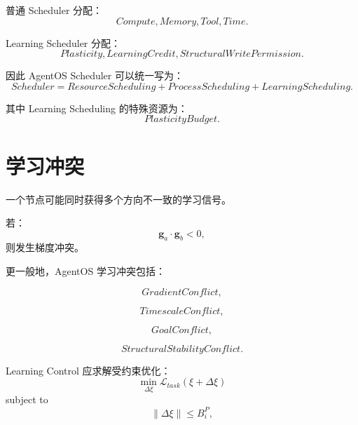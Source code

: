 普通 Scheduler 分配：
\begin{equation}
Compute,
Memory,
Tool,
Time.
\end{equation}

Learning Scheduler 分配：
\begin{equation}
Plasticity,
LearningCredit,
StructuralWritePermission.
\end{equation}

因此 AgentOS Scheduler 可以统一写为：
\begin{equation}
\boxed{
Scheduler
=
ResourceScheduling
+
ProcessScheduling
+
LearningScheduling.
}
\end{equation}

其中 Learning Scheduling 的特殊资源为：
\begin{equation}
\boxed{
PlasticityBudget.
}
\end{equation}


\section{学习冲突}

一个节点可能同时获得多个方向不一致的学习信号。

若：
\begin{equation}
\mathbf{g}_a
\cdot
\mathbf{g}_b
<
0,
\end{equation}
则发生梯度冲突。

更一般地，AgentOS 学习冲突包括：

\begin{equation}
GradientConflict,
\end{equation}

\begin{equation}
TimescaleConflict,
\end{equation}

\begin{equation}
GoalConflict,
\end{equation}

\begin{equation}
StructuralStabilityConflict.
\end{equation}

Learning Control 应求解受约束优化：
\begin{equation}
\min_{\Delta\xi}
\mathcal{L}_{task}(\xi+\Delta\xi)
\end{equation}
subject to
\begin{equation}
\|\Delta\xi\|
\leq
B_i^P,
\end{equation}

